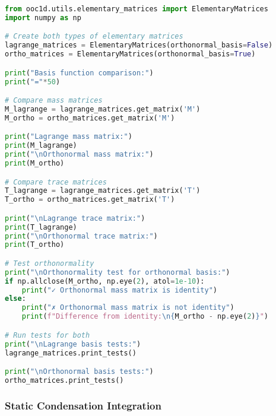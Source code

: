 \begin{lstlisting}[language=Python, caption=Basis Comparison Example]
from ooc1d.utils.elementary_matrices import ElementaryMatrices
import numpy as np

# Create both types of elementary matrices
lagrange_matrices = ElementaryMatrices(orthonormal_basis=False)
ortho_matrices = ElementaryMatrices(orthonormal_basis=True)

print("Basis function comparison:")
print("="*50)

# Compare mass matrices
M_lagrange = lagrange_matrices.get_matrix('M')
M_ortho = ortho_matrices.get_matrix('M')

print("Lagrange mass matrix:")
print(M_lagrange)
print("\nOrthonormal mass matrix:")
print(M_ortho)

# Compare trace matrices
T_lagrange = lagrange_matrices.get_matrix('T')
T_ortho = ortho_matrices.get_matrix('T')

print("\nLagrange trace matrix:")
print(T_lagrange)
print("\nOrthonormal trace matrix:")
print(T_ortho)

# Test orthonormality
print("\nOrthonormality test for orthonormal basis:")
if np.allclose(M_ortho, np.eye(2), atol=1e-10):
    print("✓ Orthonormal mass matrix is identity")
else:
    print("✗ Orthonormal mass matrix is not identity")
    print(f"Difference from identity:\n{M_ortho - np.eye(2)}")

# Run tests for both
print("\nLagrange basis tests:")
lagrange_matrices.print_tests()

print("\nOrthonormal basis tests:")
ortho_matrices.print_tests()
\end{lstlisting}

\subsubsection{Static Condensation Integration}

